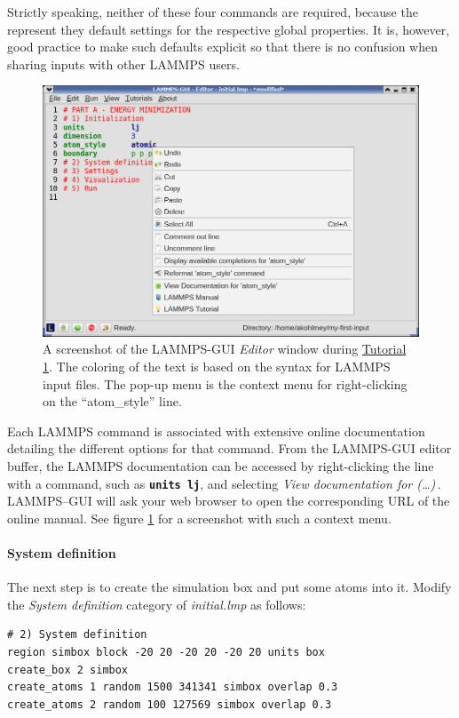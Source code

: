 \documentclass[9pt,tutorial]{livecoms}
\newcommand{\lmpcmd}[1]{\texttt{\normalsize\bfseries\textcolor{command}{#1}}}
\begin{document}
Strictly speaking, neither of these four commands are required, because
the represent they default settings for the respective global properties.
It is, however, good practice to make such defaults explicit so that
there is no confusion when sharing inputs with other LAMMPS users.

\begin{figure}
\centering
\includegraphics[width=0.65\linewidth]{GUI-1.png}
\caption{A screenshot of the LAMMPS-GUI \textit{Editor} window during
  \hyperref[lennard-jones-label]{Tutorial 1}. The coloring of the text
  is based on the syntax for LAMMPS input files.  The pop-up menu is the
  context menu for right-clicking on the ``atom\_style'' line.}
\label{fig:GUI-1}
\end{figure}

Each LAMMPS command is associated with extensive online documentation
detailing the different options for that command.  From the LAMMPS-GUI
editor buffer, the LAMMPS documentation can be accessed by
right-clicking the line with a command, such as \lmpcmd{units lj}, and
selecting \textit{View documentation for (\dots)}\,.  LAMMPS--GUI will
ask your web browser to open the corresponding URL of the online manual.
See figure \ref{fig:GUI-1} for a screenshot with such a context menu.

\paragraph{System definition}

The next step is to create the simulation box and put some atoms into it.
Modify the \textit{System definition} category of \textit{initial.lmp} as follows:
\begin{lstlisting}
# 2) System definition
region simbox block -20 20 -20 20 -20 20 units box
create_box 2 simbox
create_atoms 1 random 1500 341341 simbox overlap 0.3
create_atoms 2 random 100 127569 simbox overlap 0.3
\end{lstlisting}
\end{document}
